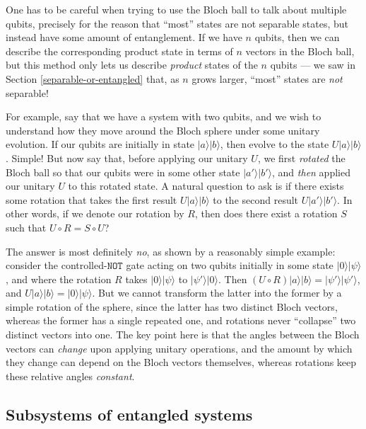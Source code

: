 \documentclass[fleqn,a4paper]{article}
\theoremstyle{definition}
\theoremstyle{definition}
\theoremstyle{definition}
\theoremstyle{definition}
\theoremstyle{remark}
\begin{document}
One has to be careful when trying to use the Bloch ball to talk about multiple qubits, precisely for the reason that ``most'' states are not separable states, but instead have some amount of entanglement.
If we have \(n\) qubits, then we can describe the corresponding product state in terms of \(n\) vectors in the Bloch ball, but this method only lets us describe \emph{product} states of the \(n\) qubits --- we saw in Section \ref{separable-or-entangled} that, as \(n\) grows larger, ``most'' states are \emph{not} separable!

For example, say that we have a system with two qubits, and we wish to understand how they move around the Bloch sphere under some unitary evolution.
If our qubits are initially in state \(|a\rangle|b\rangle\), then evolve to the state \(U|a\rangle|b\rangle\).
Simple!
But now say that, before applying our unitary \(U\), we first \emph{rotated} the Bloch ball so that our qubits were in some other state \(|a'\rangle|b'\rangle\), and \emph{then} applied our unitary \(U\) to this rotated state.
A natural question to ask is if there exists some rotation that takes the first result \(U|a\rangle|b\rangle\) to the second result \(U|a'\rangle|b'\rangle\).
In other words, if we denote our rotation by \(R\), then does there exist a rotation \(S\) such that \(U\circ R = S\circ U\)?

The answer is most definitely \emph{no}, as shown by a reasonably simple example: consider the controlled-\(\texttt{NOT}\) gate acting on two qubits initially in some state \(|0\rangle|\psi\rangle\), and where the rotation \(R\) takes \(|0\rangle|\psi\rangle\) to \(|\psi'\rangle|0\rangle\).
Then \((U\circ R)|a\rangle|b\rangle=|\psi'\rangle|\psi'\rangle\), and \(U|a\rangle|b\rangle=|0\rangle|\psi\rangle\).
But we cannot transform the latter into the former by a simple rotation of the sphere, since the latter has two distinct Bloch vectors, whereas the former has a single repeated one, and rotations never ``collapse'' two distinct vectors into one.
The key point here is that the angles between the Bloch vectors can \emph{change} upon applying unitary operations, and the amount by which they change can depend on the Bloch vectors themselves, whereas rotations keep these relative angles \emph{constant}.

\hypertarget{subsystems-of-entangled-systems}{%
\subsection{Subsystems of entangled systems}\label{subsystems-of-entangled-systems}}
\end{document}
